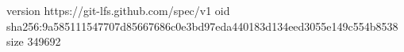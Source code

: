 version https://git-lfs.github.com/spec/v1
oid sha256:9a585111547707d85667686c0e3bd97eda440183d134eed3055e149c554b8538
size 349692
